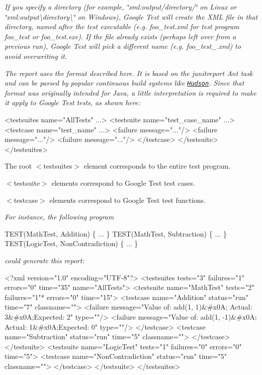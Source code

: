 {\itshape If you specify a directory (for example, {\ttfamily \char`\"{}xml\+:output/directory/\char`\"{}} on Linux or {\ttfamily \char`\"{}xml\+:output\textbackslash{}directory\textbackslash{}\char`\"{}} on Windows), Google Test will create the X\+ML file in that directory, named after the test executable (e.\+g. {\ttfamily foo\+\_\+test.\+xml} for test program {\ttfamily foo\+\_\+test} or {\ttfamily foo\+\_\+test.\+exe}). If the file already exists (perhaps left over from a previous run), Google Test will pick a different name (e.\+g. {\ttfamily foo\+\_\+test\+\_.\+xml}) to avoid overwriting it.}

{\itshape The report uses the format described here. It is based on the {\ttfamily junitreport} Ant task and can be parsed by popular continuous build systems like \href{https://hudson.dev.java.net/}{\tt Hudson}. Since that format was originally intended for Java, a little interpretation is required to make it apply to Google Test tests, as shown here\+:}

{\itshape 
\begin{DoxyCode}
<testsuites name="AllTests" ...>
  <testsuite name="test\_case\_name" ...>
    <testcase name="test\_name" ...>
      <failure message="..."/>
      <failure message="..."/>
      <failure message="..."/>
    </testcase>
  </testsuite>
</testsuites>
\end{DoxyCode}
}

{\itshape 
\begin{DoxyItemize}
\item The root {\ttfamily $<$testsuites$>$} element corresponds to the entire test program.
\item {\ttfamily $<$testsuite$>$} elements correspond to Google Test test cases.
\item {\ttfamily $<$testcase$>$} elements correspond to Google Test test functions.
\end{DoxyItemize}}

{\itshape For instance, the following program}

{\itshape 
\begin{DoxyCode}
TEST(MathTest, Addition) \{ ... \}
TEST(MathTest, Subtraction) \{ ... \}
TEST(LogicTest, NonContradiction) \{ ... \}
\end{DoxyCode}
}

{\itshape could generate this report\+:}

{\itshape 
\begin{DoxyCode}
<?xml version="1.0" encoding="UTF-8"?>
<testsuites tests="3" failures="1" errors="0" time="35" name="AllTests">
  <testsuite name="MathTest" tests="2" failures="1"* errors="0" time="15">
    <testcase name="Addition" status="run" time="7" classname="">
      <failure message="Value of: add(1, 1)&#x0A; Actual: 3&#x0A;Expected: 2" type=""/>
      <failure message="Value of: add(1, -1)&#x0A; Actual: 1&#x0A;Expected: 0" type=""/>
    </testcase>
    <testcase name="Subtraction" status="run" time="5" classname="">
    </testcase>
  </testsuite>
  <testsuite name="LogicTest" tests="1" failures="0" errors="0" time="5">
    <testcase name="NonContradiction" status="run" time="5" classname="">
    </testcase>
  </testsuite>
</testsuites>
\end{DoxyCode}
}

